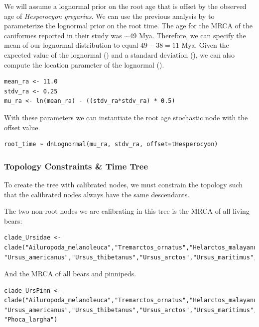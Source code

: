 We will assume a lognormal prior on the root age that is offset by the observed age of \textit{Hesperocyon gregarius}. 
We can use the previous analysis by \citet{dosReis2012} to parameterize the lognormal prior on the root time. 
The age for the MRCA of the caniformes reported in their study was $\sim$49 Mya. 
Therefore, we can specify the mean of our lognormal distribution to equal $49 - 38 = 11$ Mya.
Given the expected value of the lognormal () and a standard deviation (), we can also compute the location parameter of the lognormal ().
{\tt \begin{snugshade*}
\begin{lstlisting}
mean_ra <- 11.0
stdv_ra <- 0.25
mu_ra <- ln(mean_ra) - ((stdv_ra*stdv_ra) * 0.5)
\end{lstlisting}
\end{snugshade*}}

With these parameters we can instantiate the root age stochastic node with the offset value.
{\tt \begin{snugshade*}
\begin{lstlisting}
root_time ~ dnLognormal(mu_ra, stdv_ra, offset=tHesperocyon)
\end{lstlisting}
\end{snugshade*}}


\subsubsection{Topology Constraints \& Time Tree}

To create the tree with calibrated nodes, we must constrain the topology such that the calibrated nodes always have the same descendants.

The two non-root nodes we are calibrating in this tree is the MRCA of all living bears:
{\tt \begin{snugshade*}
\begin{lstlisting}
clade_Ursidae <- clade("Ailuropoda_melanoleuca","Tremarctos_ornatus","Helarctos_malayanus", "Ursus_americanus","Ursus_thibetanus","Ursus_arctos","Ursus_maritimus","Melursus_ursinus")
\end{lstlisting}
\end{snugshade*}}

And the MRCA of all bears and pinnipeds. 
{\tt \begin{snugshade*}
\begin{lstlisting}
clade_UrsPinn <- clade("Ailuropoda_melanoleuca","Tremarctos_ornatus","Helarctos_malayanus", "Ursus_americanus","Ursus_thibetanus","Ursus_arctos","Ursus_maritimus","Melursus_ursinus", "Phoca_largha")
\end{lstlisting}
\end{snugshade*}}

